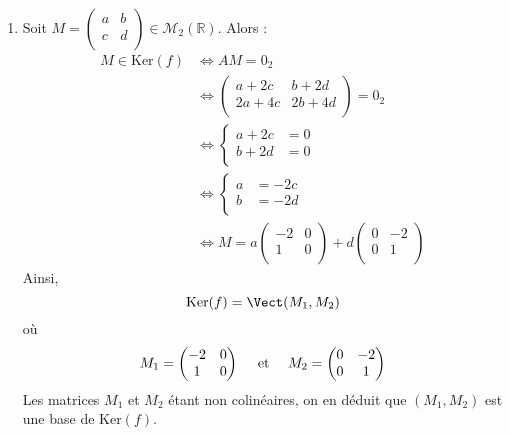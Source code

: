 \documentclass[a4paper,twoside,french,11pt]{VcCours}
\begin{document}
\begin{Exercice}{}\end{Exercice}
\begin{enumerate}
\item Soit $M = \begin{pmatrix}
a&b \\
c & d \\
\end{pmatrix} \in \mathcal{M}_2(\mathbb{R})$. Alors :
\begin{align*}
M \in \textrm{Ker}(f) & \Longleftrightarrow  AM = 0_2 \\
& \Longleftrightarrow \begin{pmatrix}
a+2c & b+2d \\
2a+4c & 2b+4d \\
\end{pmatrix} = 0_2 \\
& \Longleftrightarrow \left\lbrace \begin{array}{cl}
a+2c & = 0 \\
b+2d & = 0 \\
\end{array}\right. \\
& \Longleftrightarrow \left\lbrace \begin{array}{cl}
a& = -2c \\
b & = -2d \\
\end{array}\right. \\
& \Longleftrightarrow  M = a \begin{pmatrix}
-2 & 0 \\
1 & 0 \\
\end{pmatrix} + d \begin{pmatrix}
0 & -2 \\
0 & 1 \\
\end{pmatrix}
\end{align*}
Ainsi,
$$ \textrm{Ker}(f) = \Vect(M_1,M_2)$$
où
$$ M_1 = \begin{pmatrix}
-2 & 0 \\
1 & 0 \\
\end{pmatrix} \quad \hbox{ et } \quad M_2 = \begin{pmatrix}
0 & -2 \\
0 & 1 \\
\end{pmatrix}$$
Les matrices $M_1$ et $M_2$ étant non colinéaires, on en déduit que $(M_1,M_2)$ est une base de $\textrm{Ker}(f)$.


\end{enumerate}
\end{document}
